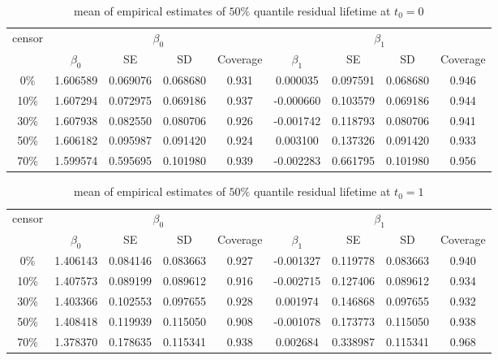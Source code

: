 \documentclass[12pt]{article}
\begin{document}
	\begin{table}[hbt!]
		\caption{mean of empirical estimates of $50\%$ quantile residual lifetime at $t_0=0$}
		\centering
		\begin{tabular}{|c|c|c|c|c|c|c|c|c|}
			\hline
			\multirow{2}{*}{censor} & \multicolumn{4}{c|}{$\beta_0$} & \multicolumn{4}{c|}{$\beta_1$}\\ \cline{2-9}
			& $\beta_0$ & SE & SD  & Coverage  & $\beta_1$ & SE & SD & Coverage\\
			\hline\hline
			0\% & 1.606589 & 0.069076 & 0.068680 & 0.931 & 0.000035 & 0.097591 & 0.068680 & 0.946 \\
			10\% & 1.607294 & 0.072975 & 0.069186 & 0.937 & -0.000660 & 0.103579 & 0.069186 & 0.944 \\
			30\% & 1.607938 & 0.082550 & 0.080706 & 0.926 & -0.001742 & 0.118793 & 0.080706 & 0.941 \\
			50\% & 1.606182 & 0.095987 & 0.091420 & 0.924 & 0.003100 & 0.137326 & 0.091420 & 0.933 \\
			70\% & 1.599574 & 0.595695 & 0.101980 & 0.939 & -0.002283 & 0.661795 & 0.101980 & 0.956 \\ 
			\hline
		\end{tabular}
	\end{table}
	\begin{table}[hbt!]
		\caption{mean of empirical estimates of $50\%$ quantile residual lifetime at $t_0=1$}
		\centering
		\begin{tabular}{|c|c|c|c|c|c|c|c|c|}
			\hline
			\multirow{2}{*}{censor} & \multicolumn{4}{c|}{$\beta_0$} & \multicolumn{4}{c|}{$\beta_1$}\\ \cline{2-9}
			& $\beta_0$ & SE & SD  & Coverage  & $\beta_1$ & SE & SD & Coverage\\
			\hline\hline
			0\% & 1.406143 & 0.084146 & 0.083663 & 0.927 & -0.001327 & 0.119778 & 0.083663 & 0.940 \\
			10\% & 1.407573 & 0.089199 & 0.089612 & 0.916 & -0.002715 & 0.127406 & 0.089612 & 0.934 \\
			30\% & 1.403366 & 0.102553 & 0.097655 & 0.928 & 0.001974 & 0.146868 & 0.097655 & 0.932 \\
			50\% & 1.408418 & 0.119939 & 0.115050 & 0.908 & -0.001078 & 0.173773 & 0.115050 & 0.938 \\
			70\% & 1.378370 & 0.178635 & 0.115341 & 0.938 & 0.002684 & 0.338987 & 0.115341 & 0.968 \\
			\hline
		\end{tabular}
	\end{table}
\end{document}
